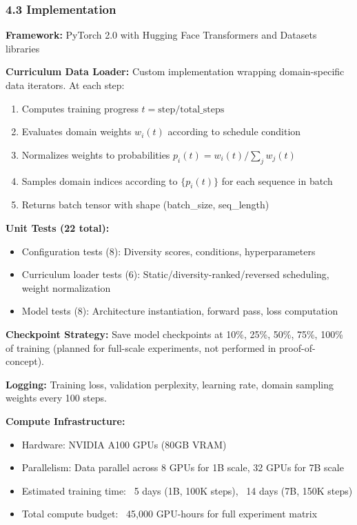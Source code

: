 \subsubsection{4.3 Implementation}

\textbf{Framework:} PyTorch 2.0 with Hugging Face Transformers and Datasets libraries

\textbf{Curriculum Data Loader:} Custom implementation wrapping domain-specific data iterators. At each step:
\begin{enumerate}
\item Computes training progress $t = \text{step} / \text{total\_steps}$
\item Evaluates domain weights $w_i(t)$ according to schedule condition
\item Normalizes weights to probabilities $p_i(t) = w_i(t) / \sum_j w_j(t)$
\item Samples domain indices according to $\{p_i(t)\}$ for each sequence in batch
\item Returns batch tensor with shape (batch_size, seq_length)
\end{enumerate}

\textbf{Unit Tests (22 total):}
\begin{itemize}
\item Configuration tests (8): Diversity scores, conditions, hyperparameters
\item Curriculum loader tests (6): Static/diversity-ranked/reversed scheduling, weight normalization
\item Model tests (8): Architecture instantiation, forward pass, loss computation
\end{itemize}

\textbf{Checkpoint Strategy:} Save model checkpoints at 10\%, 25\%, 50\%, 75\%, 100\% of training (planned for full-scale experiments, not performed in proof-of-concept).

\textbf{Logging:} Training loss, validation perplexity, learning rate, domain sampling weights every 100 steps.

\textbf{Compute Infrastructure:}
\begin{itemize}
\item Hardware: NVIDIA A100 GPUs (80GB VRAM)
\item Parallelism: Data parallel across 8 GPUs for 1B scale, 32 GPUs for 7B scale
\item Estimated training time: ~5 days (1B, 100K steps), ~14 days (7B, 150K steps)
\item Total compute budget: ~45,000 GPU-hours for full experiment matrix
\end{itemize}

